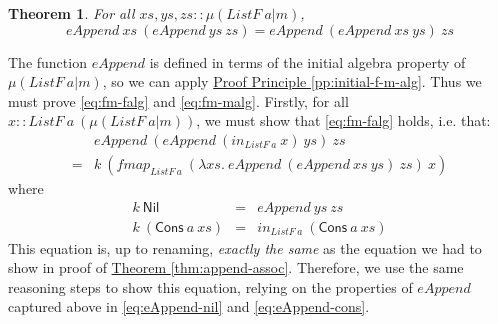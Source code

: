 \documentclass{jfp1}
\newtheorem{theorem}{Theorem}
\newcommand{\proofprinref}[1]{\hyperref[#1]{Proof Principle \ref*{#1}}}
\newcommand{\thmref}[1]{\hyperref[#1]{Theorem \ref*{#1}}}
\begin{document}
\begin{theorem}
  For all $\mathit{xs}, \mathit{ys}, \mathit{zs} :: \mu(\mathit{ListF}~a|m)$,
  \begin{displaymath}
    \mathit{eAppend}~\mathit{xs}~(\mathit{eAppend}~\mathit{ys}~\mathit{zs}) = \mathit{eAppend}~(\mathit{eAppend}~\mathit{xs}~\mathit{ys})~\mathit{zs}
  \end{displaymath}
\end{theorem}

\begin{proof*}
  The function $\mathit{eAppend}$ is defined in terms of the initial
  algebra property of $\mu(\mathit{ListF}~a|m)$, so we can apply
  \proofprinref{pp:initial-f-m-alg}. Thus we must prove
  \autoref{eq:fm-falg} and \autoref{eq:fm-malg}. Firstly, for all $x
  :: \mathit{ListF}~a~(\mu(\mathit{ListF}~a|m))$, we must show that
  \autoref{eq:fm-falg} holds, i.e. that:
  \begin{displaymath}
    \begin{array}{cl}
      &\mathit{eAppend}~(\mathit{eAppend}~(\mathit{in}_{\mathit{ListF}~a}~x)~\mathit{ys})~\mathit{zs}\\
      =&k~(\mathit{fmap}_{\mathit{ListF}~a}~(\lambda \mathit{xs}.~\mathit{eAppend}~(\mathit{eAppend}~\mathit{xs}~\mathit{ys})~\mathit{zs})~x)
    \end{array}
  \end{displaymath}
  where
  \begin{displaymath}
    \begin{array}{rcl}
      k~\mathsf{Nil} &=& \mathit{eAppend}~\mathit{ys}~\mathit{zs} \\
      k~(\mathsf{Cons}~a~\mathit{xs}) &=& \mathit{in}_{\mathit{ListF}~a}~(\mathsf{Cons}~a~\mathit{xs})
    \end{array}
  \end{displaymath}
  This equation is, up to renaming, \emph{exactly the same} as the
  equation we had to show in proof of
  \thmref{thm:append-assoc}. Therefore, we use the same reasoning
  steps to show this equation, relying on the properties of
  $\mathit{eAppend}$ captured above in \autoref{eq:eAppend-nil} and
  \autoref{eq:eAppend-cons}.


\end{proof*}
\end{document}
